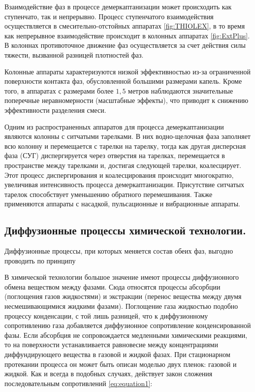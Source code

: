 Взаимодействие фаз в процессе демеркаптанизации может происходить как ступенчато, так и непрерывно. Процесс ступенчатого взаимодействия осуществляется в смесительно-отстойных аппаратах \cref{fig:THIOLEX}, в то время как непрерывное взаимодействие происходит в колонных аппаратах \cref{fig:ExtPlus}. В колоннах противоточное движение фаз осуществляется за счет действия силы тяжести, вызванной разницей плотностей фаз.

Колонные аппараты характеризуются низкой эффективностью из-за ограниченной поверхности контакта фаз, обусловленной большими размерами капель. Кроме того, в аппаратах с размерами более $1,5$ метров наблюдаются значительные поперечные неравномерности (масштабные эффекты), что приводит к снижению эффективности разделения смеси.

Одним из распространенных аппаратов для процесса демеркаптанизации являются колонны с ситчатыми тарелками. В них водно-щелочная фаза заполняет всю колонну и перемещается с тарелки на тарелку, тогда как другая дисперсная фаза (СУГ) диспергируется через отверстия на тарелках, перемещается в пространстве между тарелками и, достигая следующей тарелки, коалесцирует. Этот процесс диспергирования и коалесцирования происходит многократно, увеличивая интенсивность процесса демеркаптанизации. Присутствие ситчатых тарелок способствует уменьшению обратного перемешивания. Также применяются аппараты с насадкой, пульсационные и вибрационные аппараты.

 
\subsection{Диффузионные процессы химической технологии.} \label{sec:ch1/sec4}

Диффузионные процессы, при которых меняется состав обеих фаз, выгодно проводить по принципу

В химической технологии большое значение имеют процессы диффузионного обмена веществом между фазами. Сюда относятся процессы абсорбции (поглощения газов жидкостями) и экстракции (перенос вещества между двумя несмешивающимися жидкими фазами). Поглощение газа жидкостью подобно процессу конденсации, с той лишь разницей, что к диффузионному сопротивлению газа добавляется диффузионное сопротивление конденсированной фазы. Если абсорбция не сопровождается медленными химическими реакциями, то на поверхности устанавливается равновесие между концентрациями диффундирующего вещества в газовой и жидкой фазах. При стационарном протекании процесса он может быть описан моделью двух пленок: газовой и жидкой. Как и всегда в подобных случаях, действует закон сложения последовательным сопротивлений \cref{eq:equation1}:
 
